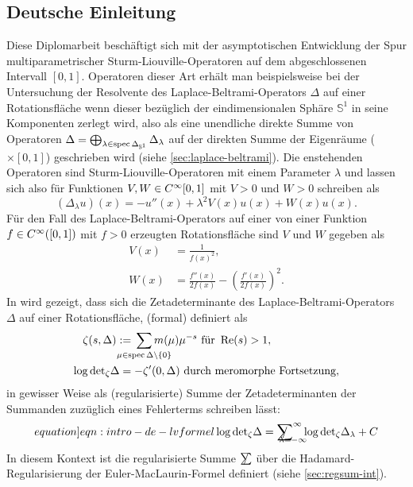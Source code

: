 \subsection{Deutsche Einleitung}
Diese Diplomarbeit beschäftigt sich mit der asymptotischen Entwicklung der Spur
multiparametrischer Sturm-Liouville-Operatoren auf dem abgeschlossenen Intervall
$[0,1]$.
%
Operatoren dieser Art erhält man beispielsweise bei der Untersuchung der
Resolvente des Laplace-Beltrami-Operators $\Delta$ auf einer Rotationsfläche
wenn dieser bezüglich der eindimensionalen Sphäre $\mathbb{S}^1$ in seine
Komponenten zerlegt wird, also als eine unendliche direkte Summe von Operatoren
$\Delta =
\bigoplus_{\lambda\in\operatorname{spec}\Delta_{{\mathbb{S}^{1}}}}\Delta_\lambda$ auf
der direkten Summe der Eigenräume ($\times[0,1]$) geschrieben wird (siehe
\cref{sec:laplace-beltrami}).
%
Die enstehenden Operatoren sind Sturm-Liouville-Operatoren mit einem Parameter
$\lambda$ und lassen sich also für Funktionen $V,W\in C^\infty_{}{[0,1]}$ mit $V > 0$
und $W > 0$ schreiben als
\begin{equation*}
  (\Delta_\lambda u)(x) = -u''(x) + \lambda^2 V(x) u(x) + W(x) u(x).
\end{equation*}
Für den Fall des Laplace-Beltrami-Operators auf einer von einer Funktion
$f\in C^\infty_{}([0,1])$ mit $f>0$ erzeugten Rotationsfläche sind $V$ und $W$ gegeben
als
\begin{align*}
  V(x) &= \frac1{f(x)^2}, \\
  W(x) &= \frac{f''(x)}{2f(x)} - \left(\frac{f'(x)}{2f(x)}\right)^2.
\end{align*}
In \cite{LV13} wird gezeigt, dass sich die Zetadeterminante des
Laplace-Beltrami-Operators $\Delta$ auf einer Rotationsfläche, (formal) definiert
als
\begin{align*}
  \zeta(s,\Delta) := {} &
  \sum_{\mathclap{\mu\in\operatorname{spec}\Delta\setminus\{0\}}}
  m(\mu)\mu^{-s} \text{ für } \Re(s) > 1, \\
  \log\zdet \Delta = {} & {-\zeta'}(0,\Delta) \text{ durch meromorphe
Fortsetzung},
\end{align*}
in gewisser Weise als (regularisierte) Summe der Zetadeterminanten der Summanden
zuzüglich eines Fehlerterms schreiben lässt:
\begin{align*}
  \label[equation]{eqn:intro-de-lvformel}
  \log\zdet\Delta = \Regsum_{\mathclap{\lambda =
  -\infty}}^\infty\log\zdet\Delta_\lambda + C
\end{align*}
In diesem Kontext ist die regularisierte Summe $\slashed{\sum}$ über die
Hadamard-Regularisierung der Euler-MacLaurin-Formel
definiert (siehe \cref{sec:regsum-int}).


